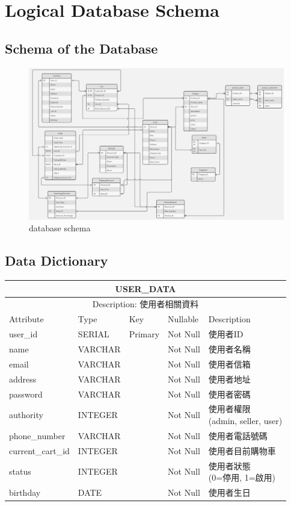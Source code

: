 \documentclass[a4paper, 12pt]{article}
\begin{document}
\newpage

\section{Logical Database Schema}
\subsection{Schema of the Database}

\begin{figure}[h]
    \centerline{\includegraphics[width=40em]{schema-diagram.jpg}}    
    \caption{database schema}
    \label{fig:enter-label}
\end{figure}

\newpage
\subsection{Data Dictionary}
\noindent\begin{tabular}{ | p{7em} | p{5.5em} |p{5.5em} | p{4.5em} | p{11em} |}
  \hline
  \multicolumn{5}{|c|}{USER_DATA} \tabularnewline
  \hline 
  \multicolumn{5}{|c|}{Description: 使用者相關資料} \tabularnewline
  \hline 
  Attribute & Type & Key & Nullable & Description \\
  \hline
  user_id & SERIAL & Primary & Not Null & 使用者ID \\
  \hline
  name & VARCHAR & &Not Null &使用者名稱\\
  \hline
  email & VARCHAR & &Not Null &使用者信箱\\
  \hline
  address & VARCHAR & &Not Null &使用者地址\\
  \hline
  password & VARCHAR & &Not Null &使用者密碼\\
  \hline
  authority & INTEGER & &Not Null&\makecell[l]{使用者權限\\(admin, seller, user)} \\
  \hline
  phone_number & VARCHAR & &Not Null &使用者電話號碼\\
  \hline
  current_cart_id & INTEGER & &Not Null &使用者目前購物車\\
  \hline
  status & INTEGER & & Not Null & \makecell[l]{使用者狀態\\(0=停用, 1=啟用)}\\
  \hline
  birthday & DATE & & Not Null &使用者生日\\
  \hline
\end{tabular}
\vspace{1em}
\end{document}

